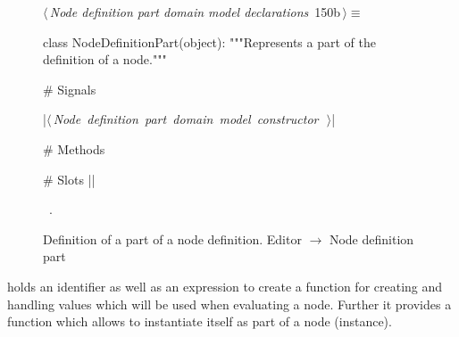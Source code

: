 \documentclass[%
    a4paper,    %
    justified,  %
    nobib,      %
    openany     %
]{tufte-book}
\makeatletter
\renewcommand{\label}[1]{\@tufte@label{##1}}%
\makeatother
\begin{document}
\begin{figure}[!htbp]
\begin{flushleft} \small
\begin{minipage}{\linewidth}\label{scrap108}\raggedright\small
{} $\langle\,${\itshape Node definition part domain model declarations}\nobreak\ {\footnotesize {150b}}$\,\rangle\equiv$
\vspace{-1ex}
\begin{pythoncode}
class NodeDefinitionPart(object):
    """Represents a part of the definition of a node."""

    # Signals

    |\hbox{$\langle\,${\itshape Node definition part domain model constructor}\nobreak\ {\footnotesize {}}$\,\rangle$}|

    # Methods

    # Slots
|\NWsep|
\end{pythoncode}
\vspace{1.5ex}
\footnotesize
\begin{list}{}{\setlength{\itemsep}{-\parsep}\setlength{\itemindent}{-\leftmargin}}
\item \NWtxtMacroRefIn\ .

\item{}
\end{list}
\end{minipage}\vspace{4ex}
\end{flushleft}
\caption{Definition of a part of a node definition.
  \newline{}\newline{}Editor $\rightarrow$ Node definition part}
\end{figure}

 holds an identifier as well as an
expression to create a function for creating and handling values which will be
used when evaluating a node. Further it provides a function which allows to
instantiate itself as part of a node (instance).
\end{document}
